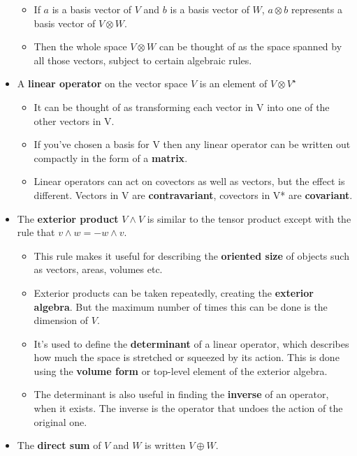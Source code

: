 \documentclass[oneside,english]{amsbook}
\numberwithin{section}{chapter}
\theoremstyle{plain}
\theoremstyle{definition}
\begin{document}
\begin{itemize}
	\begin{itemize}
		\item
		If $a$ is a basis vector of $V$ and $b$ is a basis vector of $W$, $a\otimes b$
		represents a basis vector of $V\otimes W$.
		\item
		Then the whole space $V\otimes W$ can be thought of as the space spanned by
		all those vectors, subject to certain algebraic rules.
	\end{itemize}
	\item
	A \textbf{linear operator} on the vector space $V$ is an element of $V\otimes V^\star$
	
	\begin{itemize}
		\item
		It can be thought of as transforming each vector in V into one of
		the other vectors in V.
		\item
		If you've chosen a basis for V then any linear operator can be
		written out compactly in the form of a \textbf{matrix}.
		\item
		Linear operators can act on covectors as well as vectors, but the
		effect is different. Vectors in V are \textbf{contravariant},
		covectors in V* are \textbf{covariant}.
	\end{itemize}
	\item
	The \textbf{exterior product} $V\wedge V$ is similar to the tensor product
	except with the rule that $v\wedge w = -w\wedge v$.
	
	\begin{itemize}
		\item
		This rule makes it useful for describing the \textbf{oriented size}
		of objects such as vectors, areas, volumes etc.
		\item
		Exterior products can be taken repeatedly, creating the
		\textbf{exterior algebra}. But the maximum number of times this can
		be done is the dimension of $V$.
		\item
		It's used to define the \textbf{determinant} of a linear operator,
		which describes how much the space is stretched or squeezed by its
		action. This is done using the \textbf{volume form} or top-level
		element of the exterior algebra.
		\item
		The determinant is also useful in finding the \textbf{inverse} of an
		operator, when it exists. The inverse is the operator that undoes
		the action of the original one.
	\end{itemize}
	\item
	The \textbf{direct sum} of $V$ and $W$ is written $V\oplus W$.
	

\end{itemize}
\end{document}
